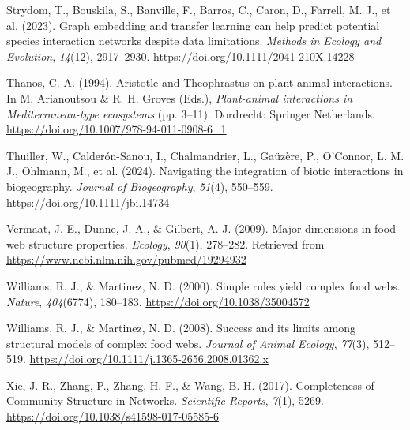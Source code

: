\documentclass[
]{agujournal2019}
\newlength{\cslhangindent}
\newenvironment{CSLReferences}[2] %
 {\begin{list}{}{%
  \setlength{\itemindent}{0pt}
  \setlength{\leftmargin}{0pt}
  \setlength{\parsep}{0pt}
  \ifodd #1
   \setlength{\leftmargin}{\cslhangindent}
   \setlength{\itemindent}{-1\cslhangindent}
  \fi
  \setlength{\itemsep}{#2\baselineskip}}}
 {\end{list}}
\begin{document}
\begin{CSLReferences}{1}{0}
Strydom, T., Bouskila, S., Banville, F., Barros, C., Caron, D., Farrell,
M. J., et al. (2023). Graph embedding and transfer learning can help
predict potential species interaction networks despite data limitations.
\emph{Methods in Ecology and Evolution}, \emph{14}(12), 2917--2930.
\url{https://doi.org/10.1111/2041-210X.14228}

Thanos, C. A. (1994). Aristotle and {Theophrastus} on plant-animal
interactions. In M. Arianoutsou \& R. H. Groves (Eds.),
\emph{Plant-animal interactions in {Mediterranean-type} ecosystems} (pp.
3--11). Dordrecht: Springer Netherlands.
\url{https://doi.org/10.1007/978-94-011-0908-6_1}

Thuiller, W., Calderón-Sanou, I., Chalmandrier, L., Gaüzère, P.,
O'Connor, L. M. J., Ohlmann, M., et al. (2024). Navigating the
integration of biotic interactions in biogeography. \emph{Journal of
Biogeography}, \emph{51}(4), 550--559.
\url{https://doi.org/10.1111/jbi.14734}

Vermaat, J. E., Dunne, J. A., \& Gilbert, A. J. (2009). Major dimensions
in food-web structure properties. \emph{Ecology}, \emph{90}(1),
278--282. Retrieved from
\url{https://www.ncbi.nlm.nih.gov/pubmed/19294932}

Williams, R. J., \& Martinez, N. D. (2000). Simple rules yield complex
food webs. \emph{Nature}, \emph{404}(6774), 180--183.
\url{https://doi.org/10.1038/35004572}

Williams, R. J., \& Martinez, N. D. (2008). Success and its limits among
structural models of complex food webs. \emph{Journal of Animal
Ecology}, \emph{77}(3), 512--519.
\url{https://doi.org/10.1111/j.1365-2656.2008.01362.x}

Xie, J.-R., Zhang, P., Zhang, H.-F., \& Wang, B.-H. (2017). Completeness
of {Community Structure} in {Networks}. \emph{Scientific Reports},
\emph{7}(1), 5269. \url{https://doi.org/10.1038/s41598-017-05585-6}

\end{CSLReferences}
\end{document}
